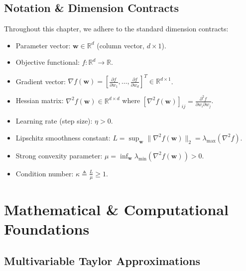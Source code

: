 \subsection{Notation \& Dimension Contracts}
Throughout this chapter, we adhere to the standard dimension contracts:
\begin{itemize}
    \item Parameter vector: $\mathbf{w} \in \mathbb{R}^d$ (column vector, $d \times 1$).
    \item Objective functional: $f: \mathbb{R}^d \to \mathbb{R}$.
    \item Gradient vector: $\nabla f(\mathbf{w}) = \left[ \frac{\partial f}{\partial w_1}, \dots, \frac{\partial f}{\partial w_d} \right]^T \in \mathbb{R}^{d \times 1}$.
    \item Hessian matrix: $\nabla^2 f(\mathbf{w}) \in \mathbb{R}^{d \times d}$ where $[\nabla^2 f(\mathbf{w})]_{ij} = \frac{\partial^2 f}{\partial w_i \partial w_j}$.
    \item Learning rate (step size): $\eta > 0$.
    \item Lipschitz smoothness constant: $L = \sup_{\mathbf{w}} \|\nabla^2 f(\mathbf{w})\|_2 = \lambda_{\max}(\nabla^2 f)$.
    \item Strong convexity parameter: $\mu = \inf_{\mathbf{w}} \lambda_{\min}(\nabla^2 f(\mathbf{w})) > 0$.
    \item Condition number: $\kappa \triangleq \frac{L}{\mu} \ge 1$.
\end{itemize}

\section{Mathematical \& Computational Foundations}

\subsection{Multivariable Taylor Approximations}

